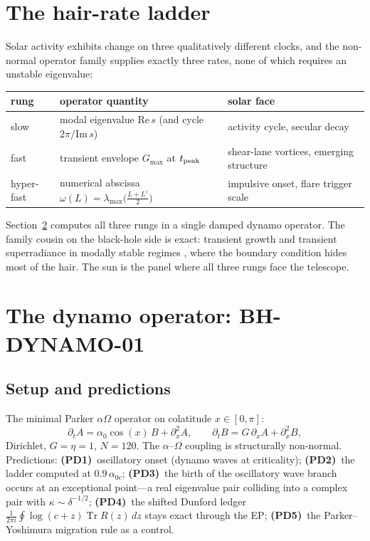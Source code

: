 \documentclass[11pt]{article}
\theoremstyle{definition}
\theoremstyle{remark}
\newcommand{\Tr}{\operatorname{Tr}}
\begin{document}
\section{The hair-rate ladder}\label{sec:ladder}
Solar activity exhibits change on three qualitatively different clocks, and
the non-normal operator family supplies exactly three rates, none of which
requires an unstable eigenvalue:
\begin{center}
\begin{tabular}{lll}
\hline
rung & operator quantity & solar face \\ \hline
slow & modal eigenvalue $\mathrm{Re}\,s$ (and cycle $2\pi/\mathrm{Im}\,s$) & activity cycle, secular decay \\
fast & transient envelope $G_{\max}$ at $t_{\rm peak}$ & shear-lane vortices, emerging structure \\
hyper-fast & numerical abscissa $\omega(L)=\lambda_{\max}\!\big(\tfrac{L+L^\dagger}{2}\big)$ & impulsive onset, flare trigger scale \\
\hline
\end{tabular}
\end{center}
Section~\ref{sec:dynamo} computes all three rungs in a single damped dynamo
operator. The family cousin on the black-hole side is exact: transient
growth and transient superradiance in modally stable regimes
\cite{besson,carballo}, where the boundary condition hides most of the hair.
The sun is the panel where all three rungs face the telescope.

\section{The dynamo operator: BH-DYNAMO-01}\label{sec:dynamo}
\subsection{Setup and predictions}
The minimal Parker $\alpha\Omega$ operator \cite{parker,charbonneau} on
colatitude $x\in[0,\pi]$:
\begin{equation}
\partial_t A = \alpha_0\cos(x)\,B + \partial_x^2 A,\qquad
\partial_t B = G\,\partial_x A + \partial_x^2 B,
\end{equation}
Dirichlet, $G=\eta=1$, $N=120$. The $\alpha$--$\Omega$ coupling is
structurally non-normal. Predictions: \textbf{(PD1)}~oscillatory onset
(dynamo waves at criticality); \textbf{(PD2)}~the ladder computed at
$0.9\,\alpha_{0c}$; \textbf{(PD3)}~the birth of the oscillatory wave branch occurs at an
exceptional point---a real eigenvalue pair colliding into a complex pair with
$\kappa\sim\delta^{-1/2}$; \textbf{(PD4)}~the shifted Dunford ledger
$\frac{1}{2\pi i}\oint\log(c+z)\Tr R(z)\,dz$ stays exact through the EP;
\textbf{(PD5)}~the Parker--Yoshimura migration rule as a control.
\end{document}

